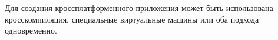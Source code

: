 Для создания кроссплатформенного приложения может быть использована кросскомпиляция, специальные виртуальные машины или оба подхода одновременно. 

